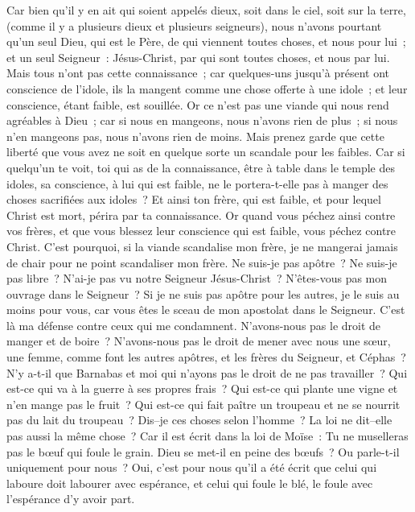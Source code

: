 \begin{multicols}{2}
Car bien qu'il y en ait qui soient appelés dieux, soit dans le ciel, soit sur la terre, (comme il y a plusieurs dieux et plusieurs seigneurs),
nous n'avons pourtant qu'un seul Dieu, qui est le Père, de qui viennent toutes choses, et nous pour lui~; et un seul Seigneur~: Jésus-Christ, par qui sont toutes choses, et nous par lui.
Mais tous n'ont pas cette connaissance~; car quelques-uns jusqu'à présent ont conscience de l'idole, ils la mangent comme une chose offerte à une idole~; et leur conscience, étant faible, est souillée.
Or ce n'est pas une viande qui nous rend agréables à Dieu~; car si nous en mangeons, nous n'avons rien de plus~; si nous n'en mangeons pas, nous n'avons rien de moins.
Mais prenez garde que cette liberté que vous avez ne soit en quelque sorte un scandale pour les faibles.
Car si quelqu'un te voit, toi qui as de la connaissance, être à table dans le temple des idoles, sa conscience, à lui qui est faible, ne le portera-t-elle pas à manger des choses sacrifiées aux idoles~?
Et ainsi ton frère, qui est faible, et pour lequel Christ est mort, périra par ta connaissance.
Or quand vous péchez ainsi contre vos frères, et que vous blessez leur conscience qui est faible, vous péchez contre Christ.
C'est pourquoi, si la viande scandalise mon frère, je ne mangerai jamais de chair pour ne point scandaliser mon frère.
\VerseOne{}Ne suis-je pas apôtre~? Ne suis-je pas libre~? N'ai-je pas vu notre Seigneur Jésus-Christ~? N'êtes-vous pas mon ouvrage dans le Seigneur~?
Si je ne suis pas apôtre pour les autres, je le suis au moins pour vous, car vous êtes le sceau de mon apostolat dans le Seigneur.
C'est là ma défense contre ceux qui me condamnent.
N'avons-nous pas le droit de manger et de boire~?
N'avons-nous pas le droit de mener avec nous une sœur, une femme, comme font les autres apôtres, et les frères du Seigneur, et Céphas~?
N'y a-t-il que Barnabas et moi qui n'ayons pas le droit de ne pas travailler~?
Qui est-ce qui va à la guerre à ses propres frais~? Qui est-ce qui plante une vigne et n'en mange pas le fruit~? Qui est-ce qui fait paître un troupeau et ne se nourrit pas du lait du troupeau~?
Dis–je ces choses selon l'homme~? La loi ne dit–elle pas aussi la même chose~?
Car il est écrit dans la loi de Moïse~: Tu ne muselleras pas le bœuf qui foule le grain. Dieu se met-il en peine des bœufs~?
Ou parle-t-il uniquement pour nous~? Oui, c'est pour nous qu'il a été écrit que celui qui laboure doit labourer avec espérance, et celui qui foule le blé, le foule avec l'espérance d'y avoir part.

\end{multicols}
